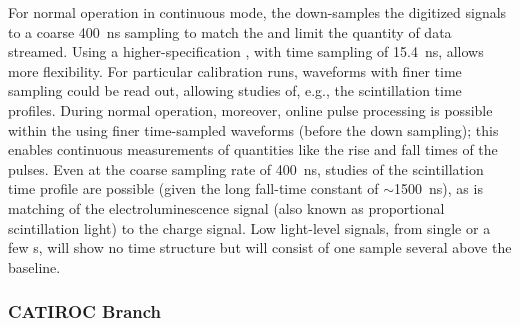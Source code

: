 For normal operation in continuous mode, the   down-samples the digitized signals to a coarse \SI{400}{ns} sampling to match the  and limit the quantity of data streamed. Using a higher-specification , with time sampling of \SI{15.4}{ns}, allows more flexibility. For particular calibration runs, waveforms with finer time sampling could be read out, allowing studies of, e.g., the  scintillation time profiles. During normal operation, moreover, online pulse processing is possible within the  using finer time-sampled waveforms (before the down sampling); this %
enables continuous measurements of quantities like the rise and fall times of the pulses. Even at the coarse sampling rate of \SI{400}{ns}, studies of the  scintillation time profile are possible (given the long fall-time constant of $\sim$\SI{1500}{ns}), as is matching of the electroluminescence signal (also known as proportional scintillation light) to the charge signal.  Low light-level signals, from single or a few \phel{}s, will show no time structure but will consist of one sample several  above the baseline. 

\subsubsection{CATIROC Branch} 

